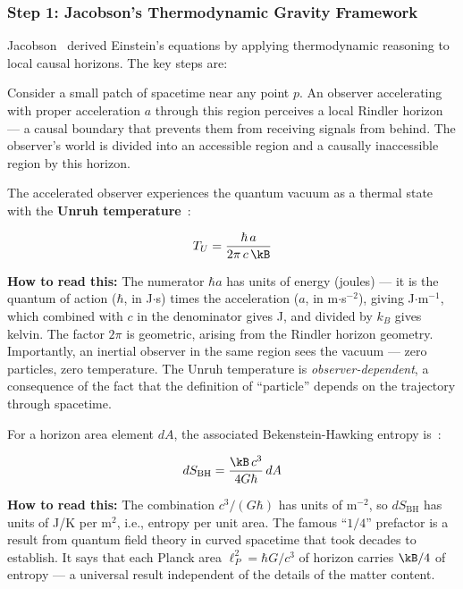 \subsubsection{Step 1: Jacobson's Thermodynamic Gravity Framework}

Jacobson~\cite{jacobson1995} derived Einstein's equations by applying
thermodynamic reasoning to local causal horizons. The key steps are:

Consider a small patch of spacetime near any point $p$. An observer
accelerating with proper acceleration $a$ through this region perceives
a local Rindler horizon --- a causal boundary that prevents them from
receiving signals from behind. The observer's world is divided into an
accessible region and a causally inaccessible region by this horizon.

The accelerated observer experiences the quantum vacuum as a thermal
state with the \textbf{Unruh temperature}~\cite{unruh1976}:

\begin{equation}
    T_U = \frac{\hbar\,a}{2\pi\,c\,\kB}
    \label{eq:unruh_temperature}
\end{equation}

\noindent \textbf{How to read this:} The numerator $\hbar a$ has units of
energy (joules) --- it is the quantum of action ($\hbar$, in J$\cdot$s)
times the acceleration ($a$, in m$\cdot$s$^{-2}$), giving J$\cdot$m$^{-1}$,
which combined with $c$ in the denominator gives J, and divided by $k_B$
gives kelvin. The factor $2\pi$ is geometric, arising from the Rindler
horizon geometry. Importantly, an inertial observer in the same region
sees the vacuum --- zero particles, zero temperature. The Unruh temperature
is \emph{observer-dependent}, a consequence of the fact that the definition
of ``particle'' depends on the trajectory through spacetime.

For a horizon area element $dA$, the associated Bekenstein-Hawking entropy
is~\cite{bekenstein1973,hawking1975}:

\begin{equation}
    dS_{\mathrm{BH}} = \frac{\kB\,c^3}{4G\hbar}\,dA
    \label{eq:bekenstein_hawking}
\end{equation}

\noindent \textbf{How to read this:} The combination $c^3/(G\hbar)$ has
units of m$^{-2}$, so $dS_{\mathrm{BH}}$ has units of J/K per m$^2$,
i.e., entropy per unit area. The famous ``$1/4$'' prefactor is a
result from quantum field theory in curved spacetime that took decades
to establish. It says that each Planck area $\ell_P^2 = \hbar G/c^3$
of horizon carries $\kB/4$ of entropy --- a universal result independent
of the details of the matter content.

